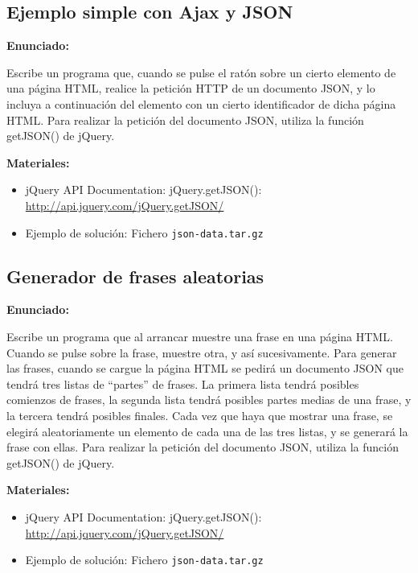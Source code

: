 \subsection{Ejemplo simple con Ajax y JSON}
\label{subsec:eje-jquery-json}

\textbf{Enunciado:}

Escribe un programa que, cuando se pulse el ratón sobre un cierto elemento de una página HTML, realice la petición HTTP de un documento JSON, y lo incluya a continuación del elemento con un cierto identificador de dicha página HTML. Para realizar la petición del documento JSON, utiliza la función getJSON() de jQuery.

\textbf{Materiales:}

\begin{itemize}
\item jQuery API Documentation: jQuery.getJSON(): \\
  \url{http://api.jquery.com/jQuery.getJSON/}
\item Ejemplo de solución: Fichero \verb|json-data.tar.gz|
\end{itemize}

\subsection{Generador de frases aleatorias}
\label{subsec:eje-jquery-frases-aleatorias}

\textbf{Enunciado:}

Escribe un programa que al arrancar muestre una frase en una página HTML. Cuando se pulse sobre la frase, muestre otra, y así sucesivamente. Para generar las frases, cuando se cargue la página HTML se pedirá un documento JSON que tendrá tres listas de ``partes'' de frases. La primera lista tendrá posibles comienzos de frases, la segunda lista tendrá posibles partes medias de una frase, y la tercera tendrá posibles finales. Cada vez que haya que mostrar una frase, se elegirá aleatoriamente un elemento de cada una de las tres listas, y se generará la frase con ellas. Para realizar la petición del documento JSON, utiliza la función getJSON() de jQuery.

\textbf{Materiales:}

\begin{itemize}
\item jQuery API Documentation: jQuery.getJSON(): \\
  \url{http://api.jquery.com/jQuery.getJSON/}
\item Ejemplo de solución: Fichero \verb|json-data.tar.gz|
\end{itemize}

